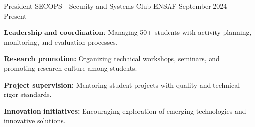 
\begin{cventries}

    \cventry
    {President} %
    {SECOPS - Security and Systems Club} %
    {ENSAF} %
    {September 2024 - Present} %
    {
        \begin{cvitems}
            \item {\textbf{Leadership and coordination:} Managing 50+ students with activity planning, monitoring, and evaluation processes.}
            \item {\textbf{Research promotion:} Organizing technical workshops, seminars, and promoting research culture among students.}
            \item {\textbf{Project supervision:} Mentoring student projects with quality and technical rigor standards.}
            \item {\textbf{Innovation initiatives:} Encouraging exploration of emerging technologies and innovative solutions.}
        \end{cvitems}
    }

\end{cventries}
